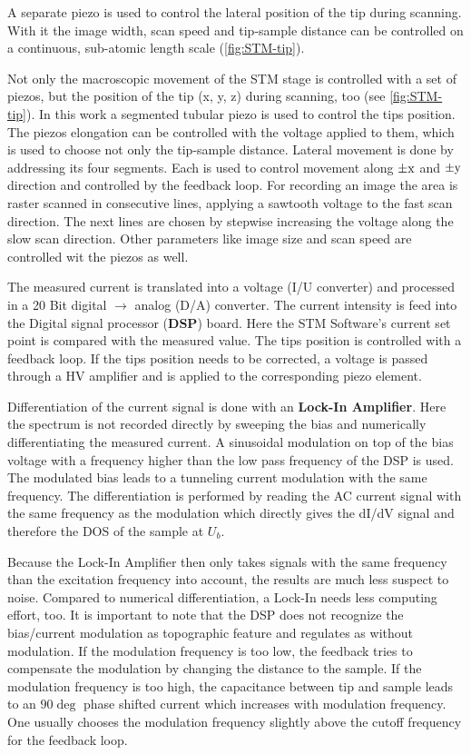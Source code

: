 A separate piezo is used to control the lateral position of the tip during scanning. With it the image width, scan speed and tip-sample distance can be controlled on a continuous, sub-atomic length scale (\autoref{fig:STM-tip}).

Not only the macroscopic movement of the STM stage is controlled with a set of piezos, but the position of the tip (x, y, z) during scanning, too (see \autoref{fig:STM-tip}). In this work a segmented tubular piezo is used to control the tips position. The piezos elongation can be controlled with the voltage applied to them, which is used to choose not only the tip-sample distance. Lateral movement is done by addressing its four segments. Each is used to control movement along $\pm \textnormal{x}$ and $\pm \textnormal{y}$ direction and controlled by the feedback loop. For recording an image the area is raster scanned in consecutive lines, applying a sawtooth voltage to the fast scan direction. The next lines are chosen by stepwise increasing the voltage along the slow scan direction. Other parameters like image size and scan speed are controlled wit the piezos as well.

The measured current is translated into a voltage (I/U converter) and processed in a 20 Bit digital $\rightarrow$ analog (D/A) converter. The current intensity is feed into the Digital signal processor (\textbf{DSP}) board. Here the STM Software's current set point is compared with the measured value. The tips position is controlled with a feedback loop. If the tips position needs to be corrected, a voltage is passed through a HV amplifier and is applied to the corresponding piezo element. 

Differentiation of the current signal is done with an \textbf{Lock-In Amplifier}. Here the spectrum is not recorded directly by sweeping the bias and numerically differentiating the measured current. A sinusoidal modulation on top of the bias voltage with a frequency higher than the low pass frequency of the DSP is used. The modulated bias leads to a tunneling current modulation with the same frequency. The differentiation is performed by reading the AC current signal with the same frequency as the modulation which directly gives the dI/dV signal and therefore the DOS of the sample at $U_b$. 

Because the Lock-In Amplifier then only takes signals with the same frequency than the excitation frequency into account, the results are much less suspect to noise. Compared to numerical differentiation, a Lock-In needs less computing effort, too. It is important to note that the DSP does not recognize the bias/current modulation as topographic feature and regulates as without modulation. If the modulation frequency is too low, the feedback tries to compensate the modulation by changing the distance to the sample. If the modulation frequency is too high, the capacitance between tip and sample leads to an $90\deg$ phase shifted current which increases with modulation frequency. One usually chooses the modulation frequency slightly above the cutoff frequency for the feedback loop.

